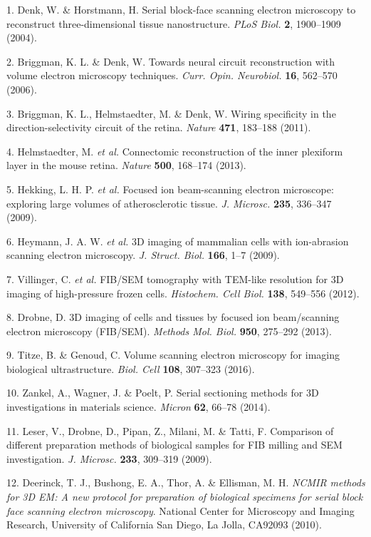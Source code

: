 \documentclass{article}
\newenvironment{reflist}{\par\small\setlength{\parindent}{0pt}\everypar{\hangindent=2.2em\hangafter=1}}{\par}
\begin{document}
\begin{reflist}
1. Denk, W. \& Horstmann, H. Serial block-face scanning electron microscopy to reconstruct three-dimensional tissue nanostructure. \emph{PLoS Biol.} \textbf{2}, 1900–1909 (2004).

2. Briggman, K. L. \& Denk, W. Towards neural circuit reconstruction with volume electron microscopy techniques. \emph{Curr. Opin. Neurobiol.} \textbf{16}, 562–570 (2006).

3. Briggman, K. L., Helmstaedter, M. \& Denk, W. Wiring specificity in the direction-selectivity circuit of the retina. \emph{Nature} \textbf{471}, 183–188 (2011).

4. Helmstaedter, M. \emph{et al.} Connectomic reconstruction of the inner plexiform layer in the mouse retina. \emph{Nature} \textbf{500}, 168–174 (2013).

5. Hekking, L. H. P. \emph{et al.} Focused ion beam-scanning electron microscope: exploring large volumes of atherosclerotic tissue. \emph{J. Microsc.} \textbf{235}, 336–347 (2009).

6. Heymann, J. A. W. \emph{et al.} 3D imaging of mammalian cells with ion-abrasion scanning electron microscopy. \emph{J. Struct. Biol.} \textbf{166}, 1–7 (2009).

7. Villinger, C. \emph{et al.} FIB/SEM tomography with TEM-like resolution for 3D imaging of high-pressure frozen cells. \emph{Histochem. Cell Biol.} \textbf{138}, 549–556 (2012).

8. Drobne, D. 3D imaging of cells and tissues by focused ion beam/scanning electron microscopy (FIB/SEM). \emph{Methods Mol. Biol.} \textbf{950}, 275–292 (2013).

9. Titze, B. \& Genoud, C. Volume scanning electron microscopy for imaging biological ultrastructure. \emph{Biol. Cell} \textbf{108}, 307–323 (2016).

10. Zankel, A., Wagner, J. \& Poelt, P. Serial sectioning methods for 3D investigations in materials science. \emph{Micron} \textbf{62}, 66–78 (2014).

11. Leser, V., Drobne, D., Pipan, Z., Milani, M. \& Tatti, F. Comparison of different preparation methods of biological samples for FIB milling and SEM investigation. \emph{J. Microsc.} \textbf{233}, 309–319 (2009).

12. Deerinck, T. J., Bushong, E. A., Thor, A. \& Ellisman, M. H. \emph{NCMIR methods for 3D EM: A new protocol for preparation of biological specimens for serial block face scanning electron microscopy}. National Center for Microscopy and Imaging Research, University of California San Diego, La Jolla, CA92093 (2010).


\end{reflist}
\end{document}
